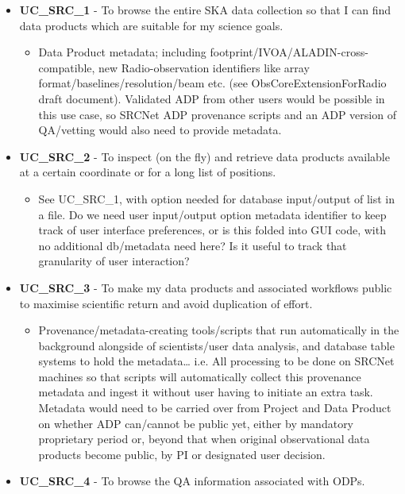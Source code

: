 \begin{itemize}[label={}]
    \item {\bf UC\_SRC\_1} - To browse the entire SKA data collection so that I can find data products which are suitable for my science goals.
    \begin{itemize}[label={}]
        \item Data Product metadata; including footprint/IVOA/ALADIN-cross-compatible, new Radio-observation identifiers like array format/baselines/resolution/beam etc. (see ObsCoreExtensionForRadio draft document).  Validated ADP from other users would be possible in this use case, so SRCNet ADP provenance scripts and an ADP version of QA/vetting would also need to provide metadata.
    \end{itemize}
    \item {\bf UC\_SRC\_2} - To inspect (on the fly) and retrieve data products available at a certain coordinate or for a long list of positions.
    \begin{itemize}[label={}]
        \item See UC\_SRC\_1, with option needed for database input/output of list in a file.  
        Do we need user input/output option metadata identifier to keep track of user interface preferences, or is this folded into GUI code, with no additional db/metadata need here?  Is it useful to track that granularity of user interaction?
    \end{itemize}
    \item {\bf UC\_SRC\_3} - To make my data products and associated workflows public to maximise scientific return and avoid duplication of effort.
    \begin{itemize}[label={}]
        \item Provenance/metadata-creating tools/scripts that run automatically in the background alongside of scientists/user data analysis, and database table systems to hold the metadata… i.e. All processing to be done on SRCNet machines so that scripts will automatically collect this provenance metadata and ingest it without user having to initiate an extra task.  
        Metadata would need to be carried over from Project and Data Product on whether ADP can/cannot be public yet, either by mandatory proprietary period or, beyond that when original observational data products become public, by PI or designated user decision.
    \end{itemize}
    \item {\bf UC\_SRC\_4} - To browse the QA information associated with ODPs.

\end{itemize}
